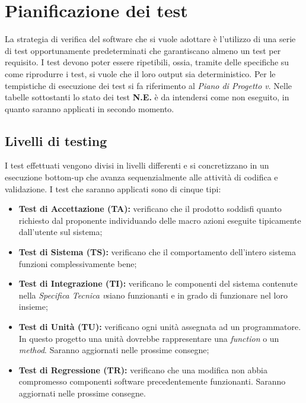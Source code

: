 \def\arraystretch{1.5}
\section{Pianificazione dei test}
La strategia di verifica del software che si vuole adottare è l'utilizzo di una serie di test opportunamente  predeterminati che garantiscano almeno un test per requisito. I test devono poter essere ripetibili, ossia, tramite delle specifiche su come riprodurre i test, si vuole che il loro output sia deterministico. Per le tempistiche di esecuzione dei test si fa riferimento al \emph{Piano di Progetto v}\VersionePP.
Nelle tabelle sottostanti lo stato dei test \textbf{N.E.} è da intendersi come non eseguito, in quanto saranno applicati in secondo momento.

\subsection{Livelli di testing}
I test effettuati vengono divisi in livelli differenti  e si concretizzano in un esecuzione bottom-up che avanza sequenzialmente alle attività di codifica e validazione. I test che saranno applicati sono di cinque tipi:
\begin{itemize}
\item \textbf{Test di Accettazione (TA): } verificano che il prodotto soddisfi quanto richiesto dal proponente individuando delle macro azioni eseguite tipicamente dall'utente sul sistema;
\item \textbf{Test di Sistema (TS): } verificano che il comportamento dell'intero sistema funzioni complessivamente bene;
\item \textbf{Test di Integrazione (TI): } verificano le componenti del sistema contenute nella \emph{Specifica Tecnica v}\VersioneST siano funzionanti e in grado di funzionare nel loro insieme;
\item \textbf{Test di Unità (TU): } verificano ogni unità assegnata ad un programmatore. In questo progetto una unità dovrebbe rappresentare una \emph{function} o un \emph{method}. Saranno aggiornati nelle prossime consegne;
\item \textbf{Test di Regressione (TR): } verificano che una modifica non abbia compromesso componenti software precedentemente funzionanti. Saranno aggiornati nelle prossime consegne.
\end{itemize}


